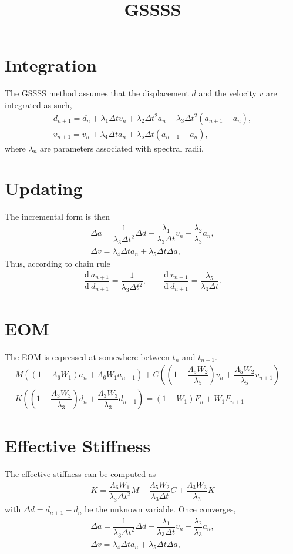 \documentclass[a4paper,10pt,fleqn]{article}
\newcommand{\ddfrac}[2]{\dfrac{\mathrm{d}~#1}{\mathrm{d}~#2}}
\newcommand{\dt}{\Delta{}t}
\newcommand{\LM}{\varLambda_6W_1}
\newcommand{\LC}{\varLambda_5W_2}
\newcommand{\LK}{\varLambda_3W_3}
\begin{document}
\title{GSSSS}\date{}
\maketitle
\section{Integration}
The GSSSS method assumes that the displacement $d$ and the velocity $v$ are integrated as such,
\begin{gather}\label{EQ1}
d_{n+1}=d_n+\lambda_1\dt{}v_n+\lambda_2\dt^2a_n+\lambda_3\dt^2\left(a_{n+1}-a_n\right),\\
v_{n+1}=v_n+\lambda_4\dt{}a_n+\lambda_5\dt\left(a_{n+1}-a_n\right),
\end{gather}
where $\lambda_n$ are parameters associated with spectral radii.
\section{Updating}
The incremental form is then
\begin{gather}
\Delta{}a=\dfrac{1}{\lambda_3\dt^2}\Delta{}d-\dfrac{\lambda_1}{\lambda_3\dt}v_n-\dfrac{\lambda_2}{\lambda_3}a_n,\\
\Delta{}v=\lambda_4\dt{}a_n+\lambda_5\dt\Delta{}a,
\end{gather}
Thus, according to chain rule
\begin{gather}
\ddfrac{a_{n+1}}{d_{n+1}}=\dfrac{1}{\lambda_3\dt^2},\qquad{}\ddfrac{v_{n+1}}{d_{n+1}}=\dfrac{\lambda_5}{\lambda_3\dt}.
\end{gather}
\section{EOM}
The EOM is expressed at somewhere between $t_n$ and $t_{n+1}$.
\begin{multline}
M\left(\left(1-\LM\right)a_n+\LM{}a_{n+1}\right)+
C\left(\left(1-\dfrac{\LC}{\lambda_5}\right)v_n+\dfrac{\LC}{\lambda_5}v_{n+1}\right)+\\
K\left(\left(1-\dfrac{\LK}{\lambda_3}\right)d_n+\dfrac{\LK}{\lambda_3}d_{n+1}\right)=
\left(1-W_1\right)F_n+W_1F_{n+1}
\end{multline}
\section{Effective Stiffness}
The effective stiffness can be computed as
\begin{gather}
\bar{K}=\dfrac{\LM}{\lambda_3\dt^2}M+\dfrac{\LC}{\lambda_3\dt}C+\dfrac{\LK}{\lambda_3}K
\end{gather}
with $\Delta{}d=d_{n+1}-d_n$ be the unknown variable. Once converges,
\begin{gather}
\Delta{}a=\dfrac{1}{\lambda_3\dt^2}\Delta{}d-\dfrac{\lambda_1}{\lambda_3\dt}v_n-\dfrac{\lambda_2}{\lambda_3}a_n,\\
\Delta{}v=\lambda_4\dt{}a_n+\lambda_5\dt\Delta{}a,
\end{gather}
\end{document}
